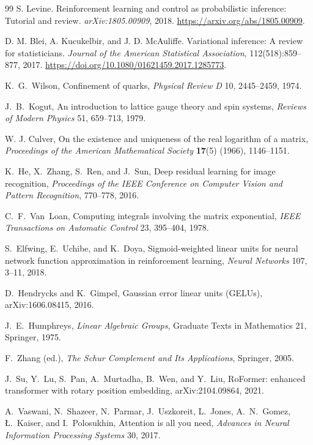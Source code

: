 \documentclass[11pt]{article}
\theoremstyle{definition}
\theoremstyle{remark}
\begin{document}
\begin{thebibliography}{99}
S. Levine. Reinforcement learning and control as probabilistic inference: Tutorial and review. \emph{arXiv:1805.00909}, 2018. \url{https://arxiv.org/abs/1805.00909}.

D. M. Blei, A. Kucukelbir, and J. D. McAuliffe. Variational inference: A review for statisticians. \emph{Journal of the American Statistical Association}, 112(518):859--877, 2017. \url{https://doi.org/10.1080/01621459.2017.1285773}.

 K.~G.~Wilson, Confinement of quarks, \emph{Physical Review D} 10, 2445--2459, 1974.

 J.~B.~Kogut, An introduction to lattice gauge theory and spin systems, \emph{Reviews of Modern Physics} 51, 659--713, 1979.

W. J. Culver, On the existence and uniqueness of the real logarithm of a matrix, \emph{Proceedings of the American Mathematical Society} \textbf{17}(5) (1966), 1146--1151.

 K.~He, X.~Zhang, S.~Ren, and J.~Sun, Deep residual learning for image recognition, \emph{Proceedings of the IEEE Conference on Computer Vision and Pattern Recognition}, 770--778, 2016.

 C.~F.~Van~Loan, Computing integrals involving the matrix exponential, \emph{IEEE Transactions on Automatic Control} 23, 395--404, 1978.

 S.~Elfwing, E.~Uchibe, and K.~Doya, Sigmoid-weighted linear units for neural network function approximation in reinforcement learning, \emph{Neural Networks} 107, 3--11, 2018.

 D.~Hendrycks and K.~Gimpel, Gaussian error linear units (GELUs), arXiv:1606.08415, 2016.

 J.~E.~Humphreys, \emph{Linear Algebraic Groups}, Graduate Texts in Mathematics 21, Springer, 1975.

 F.~Zhang (ed.), \emph{The Schur Complement and Its Applications}, Springer, 2005.

 J.~Su, Y.~Lu, S.~Pan, A.~Murtadha, B.~Wen, and Y.~Liu, RoFormer: enhanced transformer with rotary position embedding, arXiv:2104.09864, 2021.

 A.~Vaswani, N.~Shazeer, N.~Parmar, J.~Uszkoreit, L.~Jones, A.~N.~Gomez, {\L}.~Kaiser, and I.~Polosukhin, Attention is all you need, \emph{Advances in Neural Information Processing Systems} 30, 2017.


\end{thebibliography}
\end{document}
